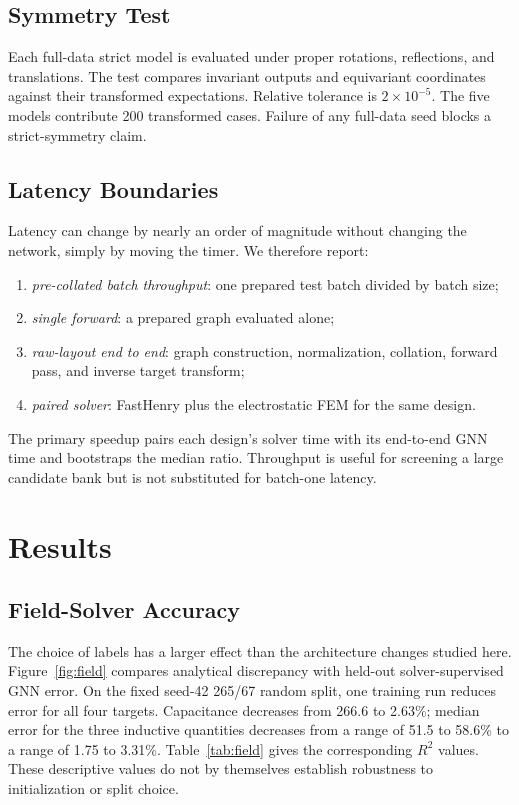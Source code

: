 \documentclass[letterpaper,twocolumn,9pt]{extarticle}
\begin{document}
\subsection{Symmetry Test}
Each full-data strict model is evaluated under proper rotations, reflections, and translations. The test compares invariant outputs and equivariant coordinates against their transformed expectations. Relative tolerance is $2\times10^{-5}$. The five models contribute 200 transformed cases. Failure of any full-data seed blocks a strict-symmetry claim.

\subsection{Latency Boundaries}
Latency can change by nearly an order of magnitude without changing the network, simply by moving the timer. We therefore report:
\begin{enumerate}[leftmargin=1.4em,itemsep=1pt,topsep=3pt]
\item \emph{pre-collated batch throughput}: one prepared test batch divided by batch size;
\item \emph{single forward}: a prepared graph evaluated alone;
\item \emph{raw-layout end to end}: graph construction, normalization, collation, forward pass, and inverse target transform;
\item \emph{paired solver}: FastHenry plus the electrostatic FEM for the same design.
\end{enumerate}
The primary speedup pairs each design's solver time with its end-to-end GNN time and bootstraps the median ratio. Throughput is useful for screening a large candidate bank but is not substituted for batch-one latency.

\section{Results}
\subsection{Field-Solver Accuracy}
The choice of labels has a larger effect than the architecture changes studied here. Figure~\ref{fig:field} compares analytical discrepancy with held-out solver-supervised GNN error. On the fixed seed-42 265/67 random split, one training run reduces error for all four targets. Capacitance decreases from 266.6 to 2.63\%; median error for the three inductive quantities decreases from a range of 51.5 to 58.6\% to a range of 1.75 to 3.31\%. Table~\ref{tab:field} gives the corresponding $R^2$ values. These descriptive values do not by themselves establish robustness to initialization or split choice.
\end{document}
